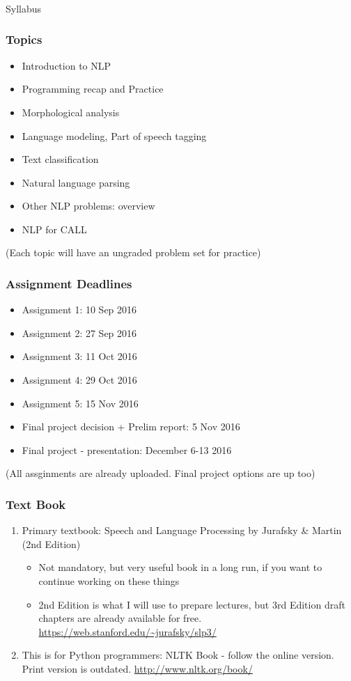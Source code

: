 \documentclass{beamer}
\begin{document}
\begin{frame}
\frametitle{}
\begin{center}
Syllabus
\end{center}
\end{frame}

\begin{frame}
\frametitle{Topics}
\begin{itemize}
\item Introduction to NLP
\item Programming recap and Practice
\item Morphological analysis
\item Language modeling, Part of speech tagging
\item Text classification
\item Natural language parsing
\item Other NLP problems: overview
\item NLP for CALL
\end{itemize}
(Each topic will have an ungraded problem set for practice)
\end{frame}

\begin{frame}
\frametitle{Assignment Deadlines}
\begin{itemize}
\item Assignment 1: 10 Sep 2016
\item Assignment 2: 27 Sep 2016
\item Assignment 3: 11 Oct 2016
\item Assignment 4: 29 Oct 2016
\item Assignment 5: 15 Nov 2016
\item Final project decision + Prelim report: 5 Nov 2016
\item Final project - presentation: December 6-13 2016
\end{itemize}
(All assginments are already uploaded. Final project options are up too)
\end{frame}

\begin{frame}
\frametitle{Text Book}
\begin{enumerate}
\item Primary textbook: Speech and Language Processing by Jurafsky \& Martin (2nd Edition)
\begin{itemize}
\item Not mandatory, but very useful book in a long run, if you want to continue working on these things
\item 2nd Edition is what I will use to prepare lectures, but 3rd Edition draft chapters are already available for free. 
\\ \url{https://web.stanford.edu/~jurafsky/slp3/}
\end{itemize}
\item This is for Python programmers: NLTK Book - follow the online version. Print version is outdated. \url{http://www.nltk.org/book/}
\end{enumerate}
\end{frame}
\end{document}

